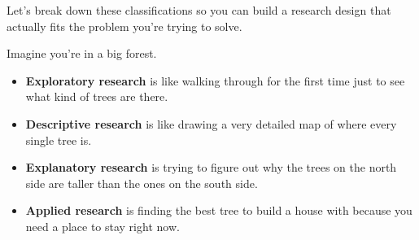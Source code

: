 \documentclass{report}
\begin{document}
Let's break down these classifications so you can build a research design that actually fits the problem you're trying to solve.

\begin{layerELI5}
    Imagine you're in a big forest. 
    \begin{itemize}
        \item \textbf{Exploratory research} is like walking through for the first time just to see what kind of trees are there. 
        \item \textbf{Descriptive research} is like drawing a very detailed map of where every single tree is. 
        \item \textbf{Explanatory research} is trying to figure out why the trees on the north side are taller than the ones on the south side. 
        \item \textbf{Applied research} is finding the best tree to build a house with because you need a place to stay right now.
    \end{itemize}
\end{layerELI5}
\end{document}
